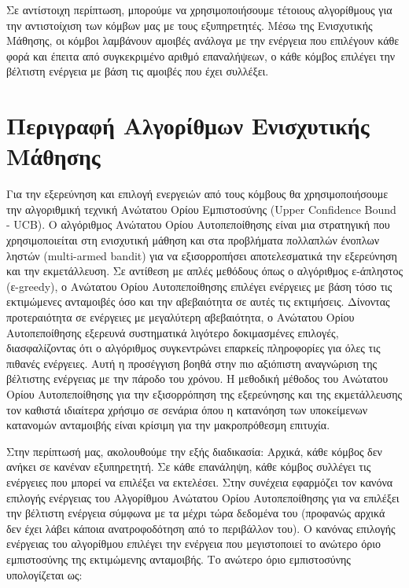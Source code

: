 Σε αντίστοιχη περίπτωση, μπορούμε να χρησιμοποιήσουμε τέτοιους αλγορίθμους για την αντιστοίχιση των κόμβων μας με τους εξυπηρετητές. Μέσω της Ενισχυτικής Μάθησης, οι κόμβοι λαμβάνουν αμοιβές ανάλογα με την ενέργεια που επιλέγουν κάθε φορά και έπειτα από συγκεκριμένο αριθμό επαναλήψεων, ο κάθε κόμβος επιλέγει την βέλτιστη ενέργεια με βάση τις αμοιβές που έχει συλλέξει. 

\section{Περιγραφή Αλγορίθμων Ενισχυτικής Μάθησης}

Για την εξερεύνηση και επιλογή ενεργειών από τους κόμβους θα χρησιμοποιήσουμε την αλγοριθμική τεχνική Ανώτατου Ορίου Εμπιστοσύνης (Upper Confidence Bound - UCB). Ο αλγόριθμος Ανώτατου Ορίου Αυτοπεποίθησης είναι μια στρατηγική που χρησιμοποιείται στη ενισχυτική μάθηση και στα προβλήματα πολλαπλών ένοπλων ληστών (multi-armed bandit) για να εξισορροπήσει αποτελεσματικά την εξερεύνηση και την εκμετάλλευση. Σε αντίθεση με απλές μεθόδους όπως ο αλγόριθμος ε-άπληστος (ε-greedy), ο Ανώτατου Ορίου Αυτοπεποίθησης επιλέγει ενέργειες με βάση τόσο τις εκτιμώμενες ανταμοιβές όσο και την αβεβαιότητα σε αυτές τις εκτιμήσεις. Δίνοντας προτεραιότητα σε ενέργειες με μεγαλύτερη αβεβαιότητα, ο Ανώτατου Ορίου Αυτοπεποίθησης εξερευνά συστηματικά λιγότερο δοκιμασμένες επιλογές, διασφαλίζοντας ότι ο αλγόριθμος συγκεντρώνει επαρκείς πληροφορίες για όλες τις πιθανές ενέργειες. Αυτή η προσέγγιση βοηθά στην πιο αξιόπιστη αναγνώριση της βέλτιστης ενέργειας με την πάροδο του χρόνου. Η μεθοδική μέθοδος του Ανώτατου Ορίου Αυτοπεποίθησης για την εξισορρόπηση της εξερεύνησης και της εκμετάλλευσης τον καθιστά ιδιαίτερα χρήσιμο σε σενάρια όπου η κατανόηση των υποκείμενων κατανομών ανταμοιβής είναι κρίσιμη για την μακροπρόθεσμη επιτυχία. 

Στην περίπτωσή μας, ακολουθούμε την εξής διαδικασία: Αρχικά, κάθε κόμβος δεν ανήκει σε κανέναν εξυπηρετητή. Σε κάθε επανάληψη, κάθε κόμβος συλλέγει τις ενέργειες που μπορεί να επιλέξει να εκτελέσει. Στην συνέχεια εφαρμόζει τον κανόνα επιλογής ενέργειας του Αλγορίθμου Ανώτατου Ορίου Αυτοπεποίθησης για να επιλέξει την βέλτιστη ενέργεια σύμφωνα με τα μέχρι τώρα δεδομένα του (προφανώς αρχικά δεν έχει λάβει κάποια ανατροφοδότηση από το περιβάλλον του). Ο κανόνας επιλογής ενέργειας του αλγορίθμου επιλέγει την ενέργεια που μεγιστοποιεί το ανώτερο όριο εμπιστοσύνης της εκτιμώμενης ανταμοιβής. Το ανώτερο όριο εμπιστοσύνης υπολογίζεται ως:

